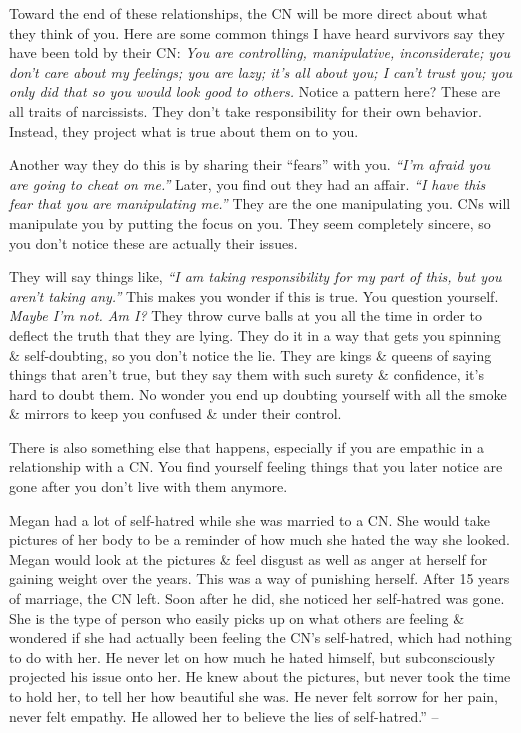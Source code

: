 \documentclass{article}
\numberwithin{equation}{section}
\begin{document}
Toward the end of these relationships, the CN will be more direct about what they think of you. Here are some common things I have heard survivors say they have been told by their CN: \textit{You are controlling, manipulative, inconsiderate; you don't care about my feelings; you are lazy; it's all about you; I can't trust you; you only did that so you would look good to others.} Notice a pattern here? These are all traits of narcissists. They don't take responsibility for their own behavior. Instead, they project what is true about them on to you.

Another way they do this is by sharing their ``fears'' with you. \textit{``I'm afraid you are going to cheat on me.''} Later, you find out they had an affair. \textit{``I have this fear that you are manipulating me.''} They are the one manipulating you. CNs will manipulate you by putting the focus on you. They seem completely sincere, so you don't notice these are actually their issues.

They will say things like, \textit{``I am taking responsibility for my part of this, but you aren't taking any.''} This makes you wonder if this is true. You question yourself. \textit{Maybe I'm not. Am I?} They throw curve balls at you all the time in order to deflect the truth that they are lying. They do it in a way that gets you spinning \& self-doubting, so you don't notice the lie. They are kings \& queens of saying things that aren't true, but they say them with such surety \& confidence, it's hard to doubt them. No wonder you end up doubting yourself with all the smoke \& mirrors to keep you confused \& under their control.

There is also something else that happens, especially if you are empathic in a relationship with a CN. You find yourself feeling things that you later notice are gone after you don't live with them anymore.

Megan had a lot of self-hatred while she was married to a CN. She would take pictures of her body to be a reminder of how much she hated the way she looked. Megan would look at the pictures \& feel disgust as well as anger at herself for gaining weight over the years. This was a way of punishing herself. After 15 years of marriage, the CN left. Soon after he did, she noticed her self-hatred was gone. She is the type of person who easily picks up on what others are feeling \& wondered if she had actually been feeling the CN's self-hatred, which had nothing to do with her. He never let on how much he hated himself, but subconsciously projected his issue onto her. He knew about the pictures, but never took the time to hold her, to tell her how beautiful she was. He never felt sorrow for her pain, never felt empathy. He allowed her to believe the lies of self-hatred.'' -- \cite[pp. 55--58]{Mirza2017}
\end{document}

